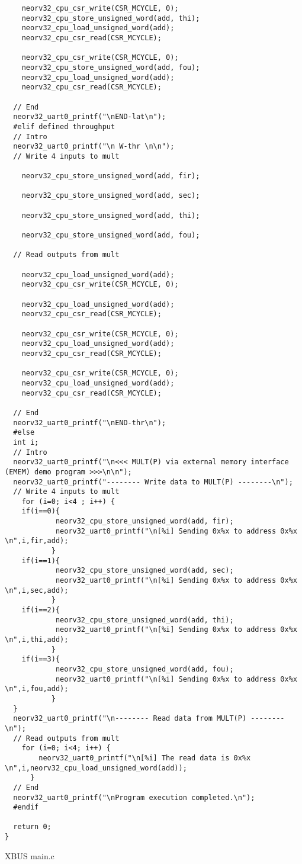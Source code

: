 \begin{code}
\begin{verbatim}
    neorv32_cpu_csr_write(CSR_MCYCLE, 0);
    neorv32_cpu_store_unsigned_word(add, thi);
    neorv32_cpu_load_unsigned_word(add);
    neorv32_cpu_csr_read(CSR_MCYCLE); 

    neorv32_cpu_csr_write(CSR_MCYCLE, 0);
    neorv32_cpu_store_unsigned_word(add, fou);
    neorv32_cpu_load_unsigned_word(add);
    neorv32_cpu_csr_read(CSR_MCYCLE); 

  // End
  neorv32_uart0_printf("\nEND-lat\n");
  #elif defined throughput
  // Intro
  neorv32_uart0_printf("\n W-thr \n\n");
  // Write 4 inputs to mult

    neorv32_cpu_store_unsigned_word(add, fir);

    neorv32_cpu_store_unsigned_word(add, sec);

    neorv32_cpu_store_unsigned_word(add, thi);

    neorv32_cpu_store_unsigned_word(add, fou);

  // Read outputs from mult

    neorv32_cpu_load_unsigned_word(add);
    neorv32_cpu_csr_write(CSR_MCYCLE, 0);

    neorv32_cpu_load_unsigned_word(add);
    neorv32_cpu_csr_read(CSR_MCYCLE); 

    neorv32_cpu_csr_write(CSR_MCYCLE, 0);
    neorv32_cpu_load_unsigned_word(add);
    neorv32_cpu_csr_read(CSR_MCYCLE);

    neorv32_cpu_csr_write(CSR_MCYCLE, 0);
    neorv32_cpu_load_unsigned_word(add);
    neorv32_cpu_csr_read(CSR_MCYCLE);

  // End
  neorv32_uart0_printf("\nEND-thr\n");
  #else
  int i;
  // Intro
  neorv32_uart0_printf("\n<<< MULT(P) via external memory interface (EMEM) demo program >>>\n\n");
  neorv32_uart0_printf("-------- Write data to MULT(P) --------\n");
  // Write 4 inputs to mult
    for (i=0; i<4 ; i++) {
    if(i==0){
            neorv32_cpu_store_unsigned_word(add, fir);
            neorv32_uart0_printf("\n[%i] Sending 0x%x to address 0x%x \n",i,fir,add);
           } 
    if(i==1){
            neorv32_cpu_store_unsigned_word(add, sec);
            neorv32_uart0_printf("\n[%i] Sending 0x%x to address 0x%x \n",i,sec,add);
           }   
    if(i==2){
            neorv32_cpu_store_unsigned_word(add, thi);
            neorv32_uart0_printf("\n[%i] Sending 0x%x to address 0x%x \n",i,thi,add);
           }   
    if(i==3){
            neorv32_cpu_store_unsigned_word(add, fou);
            neorv32_uart0_printf("\n[%i] Sending 0x%x to address 0x%x \n",i,fou,add);
           }   
  } 
  neorv32_uart0_printf("\n-------- Read data from MULT(P) --------\n");
  // Read outputs from mult
    for (i=0; i<4; i++) {
        neorv32_uart0_printf("\n[%i] The read data is 0x%x \n",i,neorv32_cpu_load_unsigned_word(add));
      }
  // End
  neorv32_uart0_printf("\nProgram execution completed.\n");
  #endif

  return 0;
}
\end{verbatim}
\caption{XBUS main.c}
\label{ap-cod:12}
\end{code}

